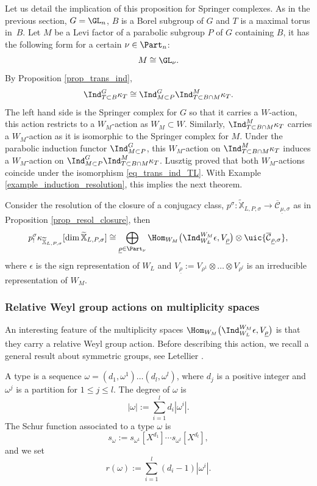 Let us detail the implication of this proposition for Springer complexes. As in the previous section, $G=\GL_n$, $B$ is a Borel subgroup of $G$ and $T$ is a maximal torus in~$B$. Let $M$ be a Levi factor of a parabolic subgroup $P$ of $G$ containing $B$, it has the following form for a certain $\nu\in\Part_n$:
\[
M\cong \GL_{\nu}.
\]
By Proposition \ref{prop_trans_ind},
\begin{equation}\label{eq_trans_ind_TL}
\Ind_{T\subset B}^G\kappa_{T}\cong \Ind_{M\subset P}^G\Ind_{T\subset B\cap M}^M \kappa_{T}.
\end{equation}
The left hand side is the Springer complex for $G$ so that it carries a $W$-action, this action restricts to a $W_M$-action as $W_M\subset W$. Similarly, $\Ind_{T\subset B\cap M}^M \kappa_{T}$ carries a $W_M$\nobreakdash-action as it is isomorphic to
the Springer complex for $M$. Under the parabolic induction functor $\Ind_{M\subset P}^{G}$, this $W_M$-action on $\Ind_{T\subset B\cap M}^M \kappa_{T}$ induces a $W_M$-action on $\Ind_{M\subset P}^{G}\Ind_{T\subset B\cap M}^M \kappa_{T}$. Lusztig \cite[2.5]{Lusztig1986} proved that both $W_M$-actions coincide under the isomorphism \eqref{eq_trans_ind_TL}. With Example \ref{example_induction_resolution}, this implies the next theorem.
\begin{theorem}\label{th_parabolic_induction_constant}
Consider the resolution of the closure of a conjugacy class, ${p^{\sigma}}:{\mathbb{\widetilde{X}}_{L,P,\sigma}}\to{\overline{\mathcal{C}}_{\underline{\mu},\sigma}}$ as in Proposition \ref{prop_resol_closure}, then
\[
p_!^{\sigma} \kappa_{\mathbb{\widetilde{X}}_{L,P,\sigma}}[\dim \mathbb{\widetilde{X}}_{L,P,\sigma}] \cong \bigoplus_{\underline{\rho}\in\Part_{\nu}} \Hom_{W_M} \bigl(\Ind_{W_L}^{W_M} \epsilon, V_{\underline{\rho}}\bigr)\otimes \uic{\overline{\mathcal{C}}_{\underline{\rho},\sigma}},
\]
where $\epsilon$ is the sign representation of $W_L$ and $V_{\underline{\rho}}:=V_{\rho^1}\otimes\dots\otimes V_{\rho^l}$ is an irreducible representation of $W_M$.
\end{theorem}

\subsubsection{Relative Weyl group actions on multiplicity spaces}\label{subsect_relative_weyl_class}
An interesting feature of the multiplicity spaces $\Hom_{W_M} \bigl(\Ind_{W_L}^{W_M} \epsilon, V_{\underline{\rho}}\bigr)$ is that they carry a relative Weyl group action. Before describing this action, we recall a general result about symmetric groups, see Letellier \cite[6.1, 6.2]{Letellier_gl}.
\begin{notations}
A type is a sequence $\omega=(d_1,\omega^1)\dots(d_l,\omega^l)$, where $d_j$ is a positive integer and $\omega^j$ is a partition for $1\le j \le l$. The degree of $\omega$ is
\[
|\omega|:=\sum_{i=1}^l d_i |\omega^i|.
\]
The Schur function associated to a type $\omega$ is
\[
s_{\omega}:= s_{\omega^1}[X^{d_1}]\cdots s_{\omega^l}[X^{d_l}],
\]
and we set
\begin{equation}\label{eq_r_omega}
r(\omega):= \sum_{i=1}^l (d_i-1)|\omega^i|.
\end{equation}
\end{notations}

